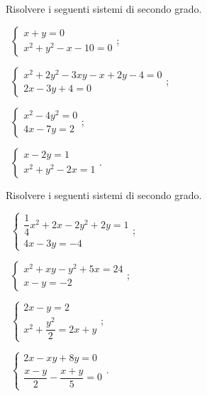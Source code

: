 \begin{esercizio}[\Ast]
\label{ese:6.8}
Risolvere i seguenti sistemi di secondo grado.
\begin{multicols}{2}
 \begin{enumeratea}
 \item~$\left\{\begin{array}{l}x+y=0\\x^2+y^2-x-10=0\end{array}\right.$;
 \item~$\left\{\begin{array}{l}x^2+2y^2-3xy-x+2y-4=0\\2x-3y+4=0\end{array}\right.$;
 \item~$\left\{\begin{array}{l}x^2-4y^2=0\\4x-7y=2\end{array}\right.$;
 \item~$\left\{\begin{array}{l}x-2y=1\\x^2+y^2-2x=1\end{array}\right.$.
 \end{enumeratea}
 \end{multicols}
\end{esercizio}

\begin{esercizio}[\Ast]
\label{ese:6.9}
Risolvere i seguenti sistemi di secondo grado.
\begin{multicols}{2}
 \begin{enumeratea}
 \item~$\left\{\begin{array}{l}\dfrac{1}{4}x^{2}+2x-2y^{2}+2y=1\\4x-3y=-4\end{array}\right.$;
 \item~$\left\{\begin{array}{l}x^2+xy-y^2+5x=24\\x-y=-2\end{array}\right.$;
 \item~$\left\{\begin{array}{l}2x-y=2\\x^{2}+\dfrac{y^{2}}{2}=2x+y\end{array}\right.$;
 \item~$\left\{\begin{array}{l}2x-xy+8y=0\\\dfrac{x-y}{2}-\dfrac{x+y}{5}=0\end{array}\right.$.
 \end{enumeratea}
 \end{multicols}
\end{esercizio}

